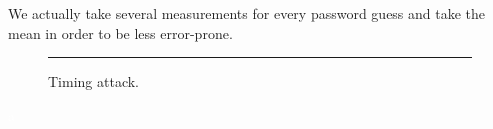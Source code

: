 We actually take several measurements for every password guess and take the mean in order to be less error-prone.

\begin{figure}[h!]
    \begin{center}
        
        \caption{Timing attack.}
        \label{fig:as5-schematic}
        \vspace{1em}\hrule
    \end{center}
\end{figure}

\textcolor{white}{a}
